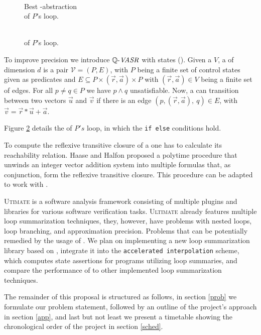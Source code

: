 \begin{minipage}[t]{0.35\linewidth} \centering
	\begin{figure}[H]
			
			\caption{\\ Best \qvasr-abstraction \\ of $P$'s loop.}
			\label{vasr}
	\end{figure}
\end{minipage}
\begin{minipage}[t]{0.3\linewidth} \centering
	\begin{figure}[H]
		
		\caption{\\ \qvasrs of $P$'s loop.}
		\label{vasrs}
	\end{figure}
\end{minipage}
\vspace*{1cm}

To improve precision we introduce $\mathit{\mathbb{Q} \text{-}VASR}$ with states (\qvasrs). Given a \qvasr $V$, a \qvasrs of dimension $d$ is a pair $\mathcal{V} = (P, E)$, with $P$ being a finite set of control states given as predicates and $E \subseteq P \times (\vec{r}, \vec{a}) \times P$ with $(\vec{r}, \vec{a}) \in V$ being a finite set of edges. For all $p \neq q \in P$ we have $p \land q$ unsatisfiable. Now, a \qvasrs can transition between two vectors $\vec{u}$ and $\vec{v}$ if there is an edge $(p, (\vec{r}, \vec{a}),\ q) \in E$, with $\vec{v} = \vec{r} * \vec{u} + \vec{a}$. \par
Figure \ref{vasrs} details the \qvasrs of $P's$ loop, in which the \texttt{if else} conditions hold. \par
To compute the reflexive transitive closure of a \qvasrs one has to calculate its reachability relation. Haase and Halfon \cite{10.1007/978-3-319-11439-2_9} proposed a polytime procedure that unwinds an integer vector addition system into multiple formulas that, as conjunction, form the reflexive transitive closure. This procedure can be adapted to work with \qvasrs. \\ \par

\textsc{Utimate}\cite{Zitat02} is a software analysis framework consisting of multiple plugins and libraries for various software verification tasks. \textsc{Ultimate} already features multiple loop summarization techniques, they, however, have problems with nested loops, loop branching, and approximation precision. Problems that can be potentially remedied by the usage of \qvasrs. We plan on implementing a new loop summarization library based on \qvasrs, integrate it into the \texttt{accelerated interpolation} scheme, which computes state assertions for programs utilizing loop summaries, and compare the performance of \qvasrs to other implemented loop summarization techniques. \par
The remainder of this proposal is structured as follows, in section \ref{prob} we formulate our problem statement, followed by an outline of the project's approach in section \ref{app}, and last but not least we present a timetable showing the chronological order of the project in section \ref{sched}.

